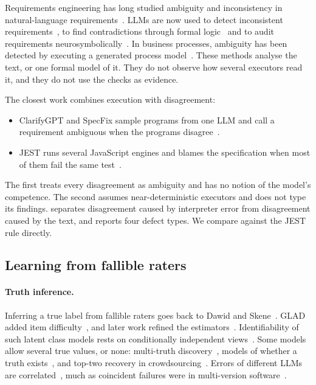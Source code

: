 Requirements engineering has long studied ambiguity and inconsistency in natural-language requirements~\cite{berry2003contract,chantree2006identifying,gervasi2005reasoning,femmer2017rapid}. LLMs are now used to detect inconsistent requirements~\cite{fantechi2023inconsistency}, to find contradictions through formal logic~\cite{gartner2024automated} and to audit requirements neurosymbolically~\cite{hall2026neurosymbolic}. In business processes, ambiguity has been detected by executing a generated process model~\cite{matei2026ambiguity}. These methods analyse the text, or one formal model of it. They do not observe how several executors read it, and they do not use the checks as evidence.

The closest work combines execution with disagreement:
\begin{itemize}[leftmargin=*]
\item ClarifyGPT and SpecFix sample programs from one LLM and call a requirement ambiguous when the programs disagree~\cite{mu2024clarifygpt,jia2025automated}.
\item JEST runs several JavaScript engines and blames the specification when most of them fail the same test~\cite{park2021jest}.
\end{itemize}
The first treats every disagreement as ambiguity and has no notion of the model's competence. The second assumes near-deterministic executors and does not type its findings. \specdx separates disagreement caused by interpreter error from disagreement caused by the text, and reports four defect types. We compare against the JEST rule directly.

\subsection{Learning from fallible raters}

\paragraph{Truth inference.} Inferring a true label from fallible raters goes back to Dawid and Skene~\cite{dawid1979maximum}. GLAD added item difficulty~\cite{whitehill2009whose}, and later work refined the estimators~\cite{hovy2013learning,zheng2017truth}. Identifiability of such latent class models rests on conditionally independent views~\cite{allman2009identifiability}. Some models allow several true values, or none: multi-truth discovery~\cite{zhao2012bayesian,wang2015integrated}, models of whether a truth exists~\cite{zhi2015modeling}, and top-two recovery in crowdsourcing~\cite{jeong2023recovering}. Errors of different LLMs are correlated~\cite{kim2025correlated,goel2025great}, much as coincident failures were in multi-version software~\cite{knight1986experimental}.

